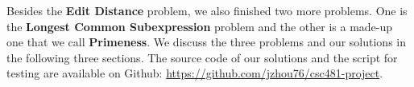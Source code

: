 Besides the {\bf Edit Distance} problem, we also finished two more problems.
One is the {\bf Longest Common Subexpression} problem and the other is
a made-up one that we call {\bf Primeness}. We discuss the three problems
and our solutions in the following three sections.
The source code of our solutions and the script for testing are available on
Github:
\href{https://github.com/jzhou76/csc481-project}{https://github.com/jzhou76/csc481-project}.
